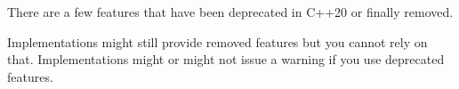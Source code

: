 There are a few features that have been deprecated in C++20 or finally removed.

Implementations might still provide removed features but you cannot rely on that. Implementations might or might not issue a warning if you use deprecated features.